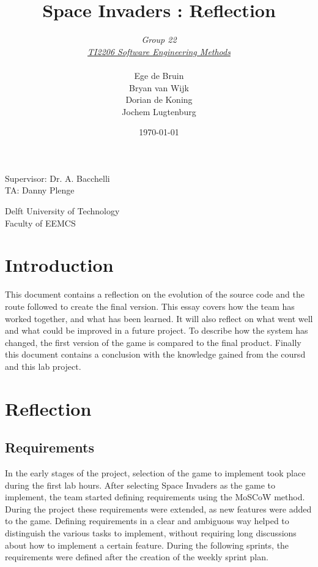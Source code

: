 \documentclass[10pt]{article}
\begin{document}
\title{Space Invaders : Reflection}
\date{\today}
\author{\textit{Group 22}\\ \textit{\underline{TI2206 Software Engineering Methods}} \\
 \\Ege de Bruin \\ Bryan van Wijk \\ Dorian de Koning \\ Jochem Lugtenburg }
 \maketitle  
 \begin{center}
Supervisor: Dr. A. Bacchelli\\
TA: Danny Plenge\\
 \end{center}     
 \begin{center}
 Delft University of Technology\\
 Faculty of EEMCS\\
 \end{center}
 \thispagestyle{empty}
 \pagebreak

\section*{Introduction}
This document contains a reflection on the evolution of the source code and the route followed to create the final version. 
This essay covers how the team has worked together, and what has been learned. It will also reflect on what went well and what could be improved in a future project. To describe how the system has changed, the first version of the game is compared to the final product. Finally this document contains a conclusion with the knowledge gained from the coursd and this lab project.

\newpage
\section*{Reflection}
\subsection*{Requirements}
In the early stages of the project, selection of the game to implement took place during the first lab hours. After selecting Space Invaders as the game to implement, the team started defining requirements using the MoSCoW method. During the project these requirements were extended, as new features were added to the game. Defining requirements in a clear and ambiguous way helped to distinguish the various tasks to implement, without requiring long discussions about how to implement a certain feature. During the following sprints, the requirements were defined after the creation of the weekly sprint plan.
\end{document}
